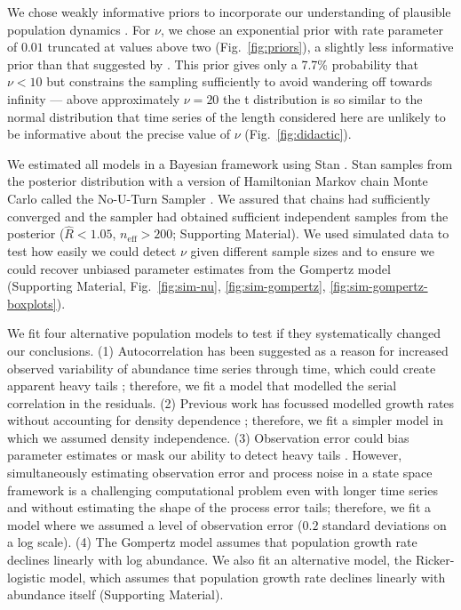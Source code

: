 We chose weakly informative priors to incorporate our understanding of
plausible population dynamics \citep[Supporting Material]{gelman2014}. For
$\nu$, we chose an exponential prior with rate parameter of $0.01$ truncated at
values above two (Fig.~\ref{fig:priors}), a slightly less informative prior
than that suggested by \citet{fernandez1998}. This prior gives only a 7.7\%
probability that $\nu < 10$ but constrains the sampling sufficiently to avoid
wandering off towards infinity --- above approximately $\nu = 20$ the
t distribution is so similar to the normal distribution that time series of the
length considered here are unlikely to be informative about the precise value
of $\nu$ (Fig.~\ref{fig:didactic}).

We estimated all models in a Bayesian framework using Stan
\citep{stan-manual2014}. Stan samples from the posterior distribution with
a version of Hamiltonian Markov chain Monte Carlo called the No-U-Turn Sampler
\citep{hoffman2014}. We assured that chains had sufficiently converged and the
sampler had obtained sufficient independent samples from the posterior
($\widehat{R} < 1.05$, $n_\mathrm{eff} > 200$; Supporting Material). We used
simulated data to test how easily we could detect $\nu$ given different sample
sizes and to ensure we could recover unbiased parameter estimates from the
Gompertz model (Supporting Material, Fig.~\ref{fig:sim-nu},
\ref{fig:sim-gompertz}, \ref{fig:sim-gompertz-boxplots}).

We fit four alternative population models to test if they systematically
changed our conclusions. (1) Autocorrelation has been suggested as a reason for
increased observed variability of abundance time series through time, which
could create apparent heavy tails \citep{inchausti2002}; therefore, we fit
a model that modelled the serial correlation in the residuals. (2) Previous
work has focussed modelled growth rates without accounting for density
dependence \citep{segura2013}; therefore, we fit a simpler model in which we
assumed density independence. (3) Observation error could bias parameter
estimates \citep{knape2012} or mask our ability to detect heavy tails
\citep{ward2007}. However, simultaneously estimating observation error and
process noise in a state space framework is a challenging computational problem
\citep[e.g.][]{dennis2006, knape2008} even with longer time series and without
estimating the shape of the process error tails; therefore, we fit a model
where we assumed a level of observation error ($0.2$ standard deviations on
a log scale). (4) The Gompertz model assumes that population growth rate
declines linearly with log abundance. We also fit an alternative model, the
Ricker-logistic model, which assumes that population growth rate declines
linearly with abundance itself (Supporting Material).

